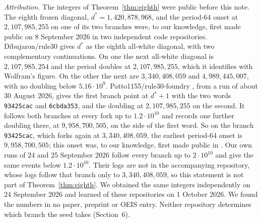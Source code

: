\documentclass[11pt]{article}
\theoremstyle{definition}
\theoremstyle{remark}
\newcommand{\dstar}{d^{*}}
\begin{document}
\emph{Attribution.} The integers of Theorem~\ref{thm:eighth} were public before this note. The eighth frozen diagonal, $\dstar=1{,}420{,}878{,}968$, and the period-$64$ onset at $2{,}107{,}985{,}255$ on one of its two branches were, to our knowledge, first made public on 8 September 2026 in two independent code repositories. Dibujaron/rule30 \cite{Dib} gives $\dstar$ as the eighth all-white diagonal, with two complementary continuations. On one the next all-white diagonal is $2{,}107{,}985{,}254$ and the period doubles at $2{,}107{,}985{,}255$, which it identifies with Wolfram's figure. On the other the next are $3{,}340{,}408{,}059$ and $4{,}989{,}445{,}007$, with no doubling below $5.16\cdot10^9$. Patto1155/rule30-foundry \cite{Pat}, from a run of about 30 August 2026, gives the first branch point at $\dstar+1$ with the two words \texttt{93425cac} and \texttt{6cbda353}, and the doubling at $2{,}107{,}985{,}255$ on the second. It follows both branches at every fork up to $1.2\cdot10^{10}$ and records one further doubling there, at $9{,}958{,}700{,}505$, on the side of the first word. So on the branch \texttt{93425cac}, which forks again at $3{,}340{,}408{,}059$, the earliest period-$64$ onset is $9{,}958{,}700{,}505$; this onset was, to our knowledge, first made public in \cite{Pat}. Our own runs of 24 and 25 September 2026 follow every branch up to $2\cdot10^{10}$ and give the same events below $1.2\cdot10^{10}$. Their logs are not in the accompanying repository, whose logs follow that branch only to $3{,}340{,}408{,}059$, so this statement is not part of Theorem~\ref{thm:eighth}. We obtained the same integers independently on 24 September 2026 and learned of these repositories on 1 October 2026. We found the numbers in no paper, preprint or OEIS entry. Neither repository determines which branch the seed takes (Section~6).
\end{document}
